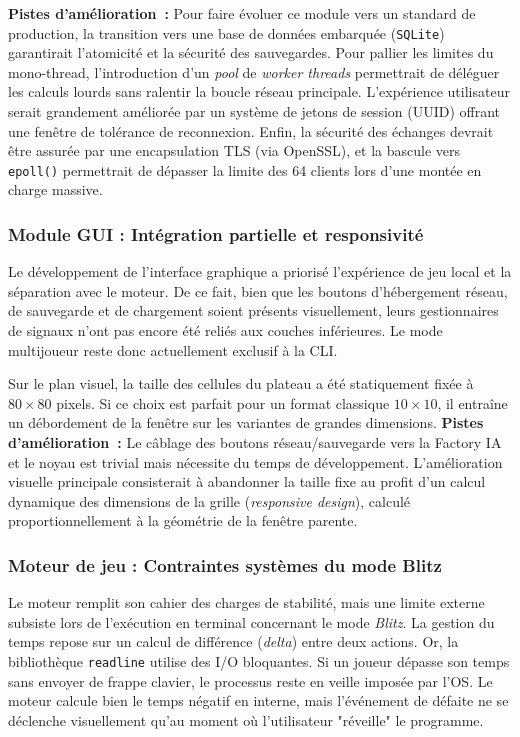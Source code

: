 \documentclass[a4paper]{article}
\begin{document}
\textbf{Pistes d'amélioration~:} Pour faire évoluer ce module vers un standard de production, la transition vers une base de données embarquée (\texttt{SQLite}) garantirait l'atomicité et la sécurité des sauvegardes. Pour pallier les limites du mono-thread, l'introduction d'un \textit{pool} de \textit{worker threads} permettrait de déléguer les calculs lourds sans ralentir la boucle réseau principale. L'expérience utilisateur serait grandement améliorée par un système de jetons de session (UUID) offrant une fenêtre de tolérance de reconnexion. Enfin, la sécurité des échanges devrait être assurée par une encapsulation TLS (via OpenSSL), et la bascule vers \texttt{epoll()} permettrait de dépasser la limite des 64 clients lors d'une montée en charge massive.

\subsubsection{Module GUI : Intégration partielle et responsivité}

Le développement de l'interface graphique a priorisé l'expérience de jeu local et la séparation avec le moteur. De ce fait, bien que les boutons d'hébergement réseau, de sauvegarde et de chargement soient présents visuellement, leurs gestionnaires de signaux n'ont pas encore été reliés aux couches inférieures. Le mode multijoueur reste donc actuellement exclusif à la CLI.

Sur le plan visuel, la taille des cellules du plateau a été statiquement fixée à $80 \times 80$ pixels. Si ce choix est parfait pour un format classique $10 \times 10$, il entraîne un débordement de la fenêtre sur les variantes de grandes dimensions. 
\textbf{Pistes d'amélioration~:} Le câblage des boutons réseau/sauvegarde vers la Factory IA et le noyau est trivial mais nécessite du temps de développement. L'amélioration visuelle principale consisterait à abandonner la taille fixe au profit d'un calcul dynamique des dimensions de la grille (\textit{responsive design}), calculé proportionnellement à la géométrie de la fenêtre parente.

\subsubsection{Moteur de jeu : Contraintes systèmes du mode Blitz}

Le moteur remplit son cahier des charges de stabilité, mais une limite externe subsiste lors de l'exécution en terminal concernant le mode \textit{Blitz}. La gestion du temps repose sur un calcul de différence (\textit{delta}) entre deux actions. Or, la bibliothèque \texttt{readline} utilise des I/O bloquantes. Si un joueur dépasse son temps sans envoyer de frappe clavier, le processus reste en veille imposée par l'OS. Le moteur calcule bien le temps négatif en interne, mais l'événement de défaite ne se déclenche visuellement qu'au moment où l'utilisateur "réveille" le programme.
\end{document}
